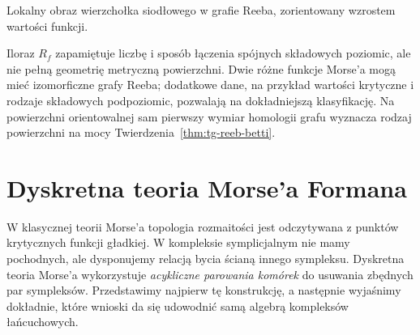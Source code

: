 \begin{samepage}
\begin{center}
\begin{minipage}{.96\linewidth}\centering
{}\par\smallskip

{\footnotesize Lokalny obraz wierzchołka siodłowego
w grafie Reeba, zorientowany wzrostem wartości funkcji.}
\end{minipage}
\end{center}
\end{samepage}

\begin{uwaga}
Iloraz $R_f$ zapamiętuje liczbę i sposób łączenia
spójnych składowych poziomic, ale nie pełną geometrię
metryczną powierzchni. Dwie różne funkcje Morse'a
mogą mieć izomorficzne grafy Reeba; dodatkowe dane,
na przykład wartości krytyczne i rodzaje składowych
podpoziomic, pozwalają na dokładniejszą klasyfikację.
Na powierzchni orientowalnej sam pierwszy wymiar homologii
grafu wyznacza rodzaj powierzchni na mocy
Twierdzenia~\ref{thm:tg-reeb-betti}.
\end{uwaga}

\chapter{Dyskretna teoria Morse'a Formana}
\label{ch:tg-forman}

W klasycznej teorii Morse'a topologia rozmaitości jest
odczytywana z punktów krytycznych funkcji gładkiej.
W kompleksie symplicjalnym nie mamy pochodnych,
ale dysponujemy relacją bycia ścianą innego sympleksu.
Dyskretna teoria Morse'a wykorzystuje \emph{acykliczne
parowania komórek} do usuwania zbędnych par sympleksów.
Przedstawimy najpierw tę konstrukcję, a następnie
wyjaśnimy dokładnie, które wnioski da się udowodnić
samą algebrą kompleksów łańcuchowych.

